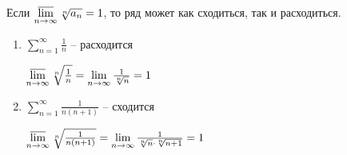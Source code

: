 \begin{remark}\thmslashn
	
	Если $ \varlimsup\limits_{n \to \infty} \sqrt[n]{a_n} = 1$, то ряд может как сходиться, так и расходиться.

	\begin{enumerate}

		\item $\sum\limits_{n = 1}^{\infty} \frac1n$ -- расходится

		$\varlimsup\limits_{n \to \infty} \sqrt[n]{\frac 1n} = \lim\limits_{n \to \infty} \frac 1 {\sqrt[n] {n}} = 1$

		\item $\sum\limits_{n = 1}^{\infty} \frac1{n(n+1)}$ -- сходится
	
		$\varlimsup\limits_{n \to \infty} \sqrt[n]{\frac 1{n(n+1)}} = \lim\limits_{n \to \infty} \frac 1 {\sqrt[n] {n} \cdot \sqrt[n] {n + 1}} = 1$
	\end{enumerate}
\end{remark}


